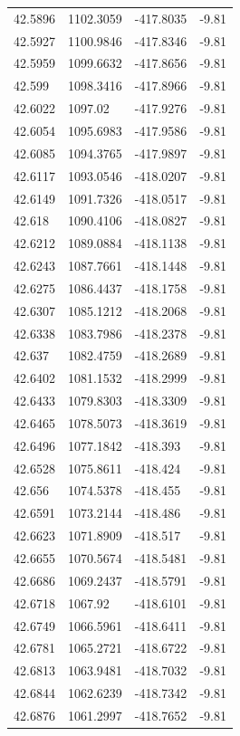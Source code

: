 \begin{table}[H]
\begin{tabular}{llll}
42.5896 & 1102.3059 & -417.8035 & -9.81 \\
42.5927 & 1100.9846 & -417.8346 & -9.81 \\
42.5959 & 1099.6632 & -417.8656 & -9.81 \\
42.599 & 1098.3416 & -417.8966 & -9.81 \\
42.6022 & 1097.02 & -417.9276 & -9.81 \\
42.6054 & 1095.6983 & -417.9586 & -9.81 \\
42.6085 & 1094.3765 & -417.9897 & -9.81 \\
42.6117 & 1093.0546 & -418.0207 & -9.81 \\
42.6149 & 1091.7326 & -418.0517 & -9.81 \\
42.618 & 1090.4106 & -418.0827 & -9.81 \\
42.6212 & 1089.0884 & -418.1138 & -9.81 \\
42.6243 & 1087.7661 & -418.1448 & -9.81 \\
42.6275 & 1086.4437 & -418.1758 & -9.81 \\
42.6307 & 1085.1212 & -418.2068 & -9.81 \\
42.6338 & 1083.7986 & -418.2378 & -9.81 \\
42.637 & 1082.4759 & -418.2689 & -9.81 \\
42.6402 & 1081.1532 & -418.2999 & -9.81 \\
42.6433 & 1079.8303 & -418.3309 & -9.81 \\
42.6465 & 1078.5073 & -418.3619 & -9.81 \\
42.6496 & 1077.1842 & -418.393 & -9.81 \\
42.6528 & 1075.8611 & -418.424 & -9.81 \\
42.656 & 1074.5378 & -418.455 & -9.81 \\
42.6591 & 1073.2144 & -418.486 & -9.81 \\
42.6623 & 1071.8909 & -418.517 & -9.81 \\
42.6655 & 1070.5674 & -418.5481 & -9.81 \\
42.6686 & 1069.2437 & -418.5791 & -9.81 \\
42.6718 & 1067.92 & -418.6101 & -9.81 \\
42.6749 & 1066.5961 & -418.6411 & -9.81 \\
42.6781 & 1065.2721 & -418.6722 & -9.81 \\
42.6813 & 1063.9481 & -418.7032 & -9.81 \\
42.6844 & 1062.6239 & -418.7342 & -9.81 \\
42.6876 & 1061.2997 & -418.7652 & -9.81 \\

\end{tabular}
\end{table}
